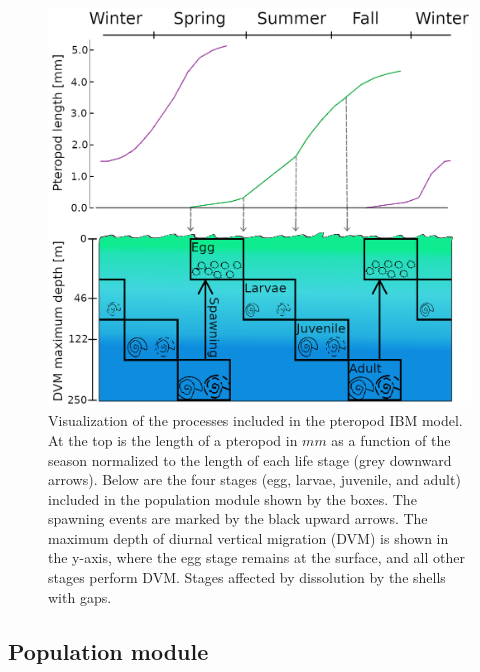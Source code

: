 \begin{figure}[tbh!]
    \centering
    
        \includegraphics[scale=0.5]{images/Model_sketch_V2_stages.png}
       
    
    \caption{Visualization of the processes included in the pteropod IBM model. At the top is the length of a pteropod in $mm$ as a function of the season normalized to the length of each life stage (grey downward arrows). Below are the four stages (egg, larvae, juvenile, and adult) included in the population module shown by the boxes. The spawning events are marked by the black upward arrows. The maximum depth of diurnal vertical migration (DVM) is shown in the y-axis, where the egg stage remains at the surface, and all other stages perform DVM. Stages affected by dissolution by the shells with gaps.}
    \label{fig:model_visualization}
\end{figure}


\subsection{Population module}

